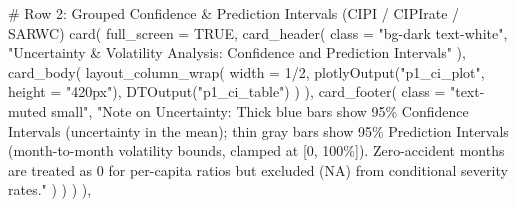 \documentclass[
  letterpaper,
  DIV=11,
  numbers=noendperiod]{scrartcl}
\newenvironment{Shaded}{\begin{snugshade}}{\end{snugshade}}
\newcommand{\AttributeTok}[1]{\textcolor[rgb]{0.40,0.45,0.13}{#1}}
\newcommand{\CommentTok}[1]{\textcolor[rgb]{0.37,0.37,0.37}{#1}}
\newcommand{\ConstantTok}[1]{\textcolor[rgb]{0.56,0.35,0.01}{#1}}
\newcommand{\DecValTok}[1]{\textcolor[rgb]{0.68,0.00,0.00}{#1}}
\newcommand{\FunctionTok}[1]{\textcolor[rgb]{0.28,0.35,0.67}{#1}}
\newcommand{\NormalTok}[1]{\textcolor[rgb]{0.00,0.23,0.31}{#1}}
\newcommand{\SpecialCharTok}[1]{\textcolor[rgb]{0.37,0.37,0.37}{#1}}
\newcommand{\StringTok}[1]{\textcolor[rgb]{0.13,0.47,0.30}{#1}}
\begin{document}
\begin{Shaded}
\begin{Highlighting}[]
      \CommentTok{\# Row 2: Grouped Confidence \& Prediction Intervals (CIPI / CIPIrate / SARWC)}
      \FunctionTok{card}\NormalTok{(}
        \AttributeTok{full\_screen =} \ConstantTok{TRUE}\NormalTok{,}
        \FunctionTok{card\_header}\NormalTok{(}
          \AttributeTok{class =} \StringTok{"bg{-}dark text{-}white"}\NormalTok{,}
          \StringTok{"Uncertainty \& Volatility Analysis: Confidence and Prediction Intervals"}
\NormalTok{        ),}
        \FunctionTok{card\_body}\NormalTok{(}
          \FunctionTok{layout\_column\_wrap}\NormalTok{(}
            \AttributeTok{width =} \DecValTok{1}\SpecialCharTok{/}\DecValTok{2}\NormalTok{,}
            \FunctionTok{plotlyOutput}\NormalTok{(}\StringTok{"p1\_ci\_plot"}\NormalTok{, }\AttributeTok{height =} \StringTok{"420px"}\NormalTok{),}
            \FunctionTok{DTOutput}\NormalTok{(}\StringTok{"p1\_ci\_table"}\NormalTok{)}
\NormalTok{          )}
\NormalTok{        ),}
        \FunctionTok{card\_footer}\NormalTok{(}
          \AttributeTok{class =} \StringTok{"text{-}muted small"}\NormalTok{,}
          \StringTok{"Note on Uncertainty: Thick blue bars show 95\% Confidence Intervals (uncertainty in the mean); thin gray bars show 95\% Prediction Intervals (month{-}to{-}month volatility bounds, clamped at [0, 100\%]). Zero{-}accident months are treated as 0 for per{-}capita ratios but excluded (NA) from conditional severity rates."}
\NormalTok{        )}
\NormalTok{      )}
\NormalTok{    )}
\NormalTok{  ),}


\end{Highlighting}
\end{Shaded}
\end{document}
